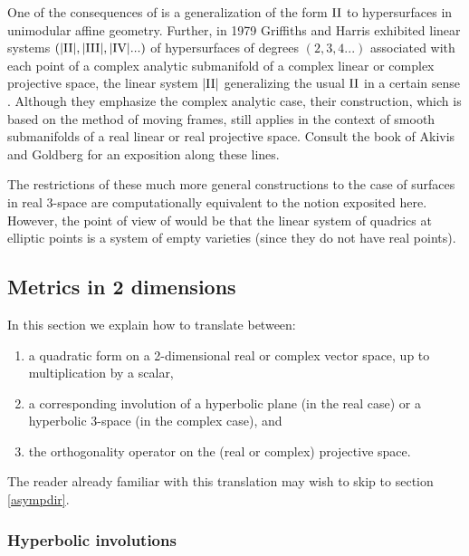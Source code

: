 \documentclass[11pt]{article}
\numberwithin{equation}{section}
\theoremstyle{plain}
\theoremstyle{remark}
\newcommand{\II}{\textnormal{II}}
\begin{document}
One of the consequences of \cite{calabi} is a generalization of the form $\II$ to hypersurfaces in unimodular affine geometry. Further, in 1979 Griffiths and Harris exhibited linear systems $(|\II|,|\text{III}|,|\text{IV}|...)$ of hypersurfaces of degrees $(2,3,4...)$ associated with each point of a complex analytic submanifold of a complex linear or complex projective space, the linear system $|\II|$ generalizing the usual $\II$ in a certain sense \cite{gh}. Although they emphasize the complex analytic case, their construction, which is based on the method of moving frames, still applies in the context of smooth submanifolds of a real linear or real projective space. Consult the book of Akivis and Goldberg \cite{ag} for an exposition along these lines.

The restrictions of these much more general constructions to the case of surfaces in real 3-space are computationally equivalent to the notion exposited here. However, the point of view of \cite{gh} would be that the linear system of quadrics at elliptic points is a system of empty varieties (since they do not have real points).

\subsection{Metrics in 2 dimensions}\label{metrics2d}

In this section we explain how to translate between:
\begin{enumerate}
\itemsep0em
\item{a quadratic form on a 2-dimensional real or complex vector space, up to multiplication by a scalar,}
\item{a corresponding involution of a hyperbolic plane (in the real case) or a hyperbolic 3-space (in the complex case), and}
\item{the orthogonality operator on the (real or complex) projective space.}

\end{enumerate}

The reader already familiar with this translation may wish to skip to section \ref{asympdir}.

\subsubsection{Hyperbolic involutions}
\end{document}
